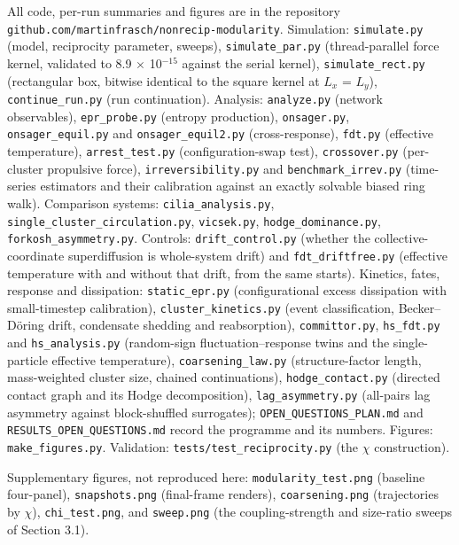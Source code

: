 \documentclass[aps,pre,preprint,superscriptaddress,nofootinbib,longbibliography]{revtex4-2}
\begin{document}
All code, per-run summaries and figures are in the repository \texttt{github.com/martinfrasch/nonrecip-modularity}. Simulation: \texttt{simulate.py} (model, reciprocity parameter, sweeps), \texttt{simulate\_par.py} (thread-parallel force kernel, validated to 8.9 $\times$ 10$^{-15}$ against the serial kernel), \texttt{simulate\_rect.py} (rectangular box, bitwise identical to the square kernel at $L_x$ = $L_y$), \texttt{continue\_run.py} (run continuation). Analysis: \texttt{analyze.py} (network observables), \texttt{epr\_probe.py} (entropy production), \texttt{onsager.py}, \texttt{onsager\_equil.py} and \texttt{onsager\_equil2.py} (cross-response), \texttt{fdt.py} (effective temperature), \texttt{arrest\_test.py} (configuration-swap test), \texttt{crossover.py} (per-cluster propulsive force), \texttt{irreversibility.py} and \texttt{benchmark\_irrev.py} (time-series estimators and their calibration against an exactly solvable biased ring walk). Comparison systems: \texttt{cilia\_analysis.py}, \texttt{single\_cluster\_circulation.py}, \texttt{vicsek.py}, \texttt{hodge\_dominance.py}, \texttt{forkosh\_asymmetry.py}. Controls: \texttt{drift\_control.py} (whether the collective-coordinate superdiffusion is whole-system drift) and \texttt{fdt\_driftfree.py} (effective temperature with and without that drift, from the same starts). Kinetics, fates, response and dissipation: \texttt{static\_epr.py} (configurational excess dissipation with small-timestep calibration), \texttt{cluster\_kinetics.py} (event classification, Becker--D\"oring drift, condensate shedding and reabsorption), \texttt{committor.py}, \texttt{hs\_fdt.py} and \texttt{hs\_analysis.py} (random-sign fluctuation--response twins and the single-particle effective temperature), \texttt{coarsening\_law.py} (structure-factor length, mass-weighted cluster size, chained continuations), \texttt{hodge\_contact.py} (directed contact graph and its Hodge decomposition), \texttt{lag\_asymmetry.py} (all-pairs lag asymmetry against block-shuffled surrogates); \texttt{OPEN\_QUESTIONS\_PLAN.md} and \texttt{RESULTS\_OPEN\_QUESTIONS.md} record the programme and its numbers. Figures: \texttt{make\_figures.py}. Validation: \texttt{tests/test\_reciprocity.py} (the $\chi$ construction).

Supplementary figures, not reproduced here: \texttt{modularity\_test.png} (baseline four-panel), \texttt{snapshots.png} (final-frame renders), \texttt{coarsening.png} (trajectories by $\chi$), \texttt{chi\_test.png}, and \texttt{sweep.png} (the coupling-strength and size-ratio sweeps of Section 3.1).
\end{document}
